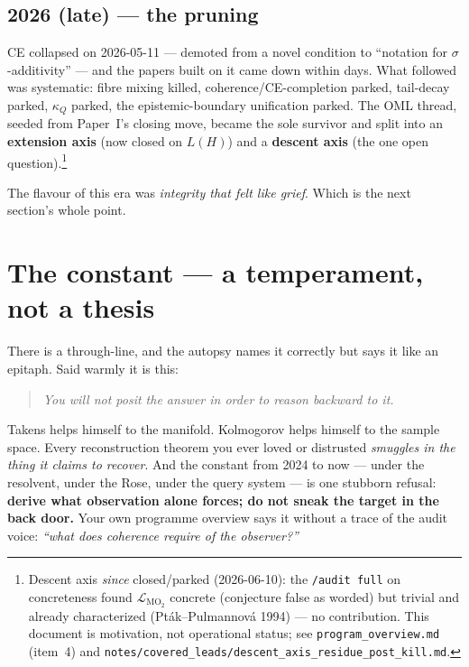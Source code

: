 \documentclass[11pt]{article}
\theoremstyle{remark}
\begin{document}
\subsection{2026 (late) --- the pruning}

CE collapsed on 2026-05-11 --- demoted from a novel condition to ``notation for
$\sigma$-additivity'' --- and the papers built on it came down within days. What
followed was systematic: fibre mixing killed, coherence/CE-completion parked,
tail-decay parked, $\kappa_Q$ parked, the epistemic-boundary unification parked.
The OML thread, seeded from Paper~I's closing move, became the sole survivor and
split into an \textbf{extension axis} (now closed on $L(H)$) and a
\textbf{descent axis} (the one open question).\footnote{Descent axis \emph{since}
closed/parked (2026-06-10): the \texttt{/audit full} on concreteness found
$\mathcal L_{\mathrm{MO}_2}$ concrete (conjecture false as worded) but trivial and
already characterized (Pt\'ak--Pulmannov\'a 1994) --- no contribution. This
document is motivation, not operational status; see \texttt{program\_overview.md}
(item~4) and \texttt{notes/covered\_leads/descent\_axis\_residue\_post\_kill.md}.}

The flavour of this era was \emph{integrity that felt like grief}. Which is the
next section's whole point.

\section{The constant --- a temperament, not a thesis}

There is a through-line, and the autopsy names it correctly but says it like an
epitaph. Said warmly it is this:

\begin{quote}
\itshape
You will not posit the answer in order to reason backward to it.
\end{quote}

\noindent
Takens helps himself to the manifold. Kolmogorov helps himself to the sample
space. Every reconstruction theorem you ever loved or distrusted \emph{smuggles
in the thing it claims to recover}. And the constant from 2024 to now --- under
the resolvent, under the Rose, under the query system --- is one stubborn
refusal: \textbf{derive what observation alone forces; do not sneak the target in
the back door.} Your own programme overview says it without a trace of the audit
voice: \emph{``what does coherence require of the observer?''}
\end{document}

